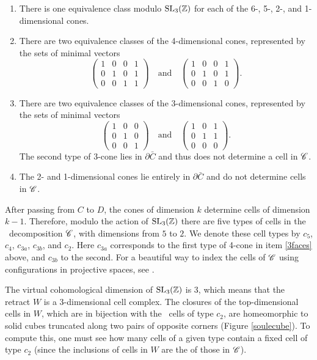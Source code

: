 \begin{enumerate}
\item There is one equivalence class modulo $\operatorname{SL}_{3} (\mathbb{Z})$ for each of the
6-, 5-, 2-, and
1-dimensional cones.
\item There are two equivalence classes of the 4-dimensional cones,
represented by the sets of minimal vectors
\[
\left(\begin{array}{cccc}
1&0&0&1\\
0&1&0&1\\
0&0&1&1
\end{array} \right)\quad\text{and}\quad 
\left(\begin{array}{cccc}
1&0&0&1\\
0&1&0&1\\
0&0&1&0
\end{array} \right).\label{3faces}
\]
\item There are two equivalence classes of the 3-dimensional cones,
represented by the sets of minimal vectors
\[
\left(\begin{array}{cccc}
1&0&0\\
0&1&0\\
0&0&1
\end{array} \right)\quad\text{and}\quad 
\left(\begin{array}{cccc}
1&0&1\\
0&1&1\\
0&0&0
\end{array} \right).
\]
The second type of 3-cone lies in $\partial \bar C$ and thus does 
not determine a cell in $\mathscr C$.

\item The 2- and 1-dimensional cones lie entirely in
$\partial \bar C$ and do not determine cells in $\mathscr C$.
\end{enumerate}

After passing from $C$ to $D$, the cones of dimension $k$ determine
cells of dimension $k-1$.
Therefore, modulo the action of $\operatorname{SL}_{3} (\mathbb{Z})$ there are five types of
cells in the \Vor \ decomposition $\mathscr C$, with dimensions from $5$ to $2$.
We denote these cell types by $c_{5}$, $c_{4}$, $c_{3a}$, $c_{3b}$,
and $c_{2}$.  Here $c_{3a}$ corresponds to the first type of 4-cone in item
\eqref{3faces} above, and $c_{3b}$ to the second.  For a beautiful way
to index the cells of $\mathscr C$ using configurations in projective spaces,
see \cite{M91}.

The virtual cohomological dimension of $\operatorname{SL}_{3} (\mathbb{Z})$ is 3, which
means that the retract $W$ is a 3-dimensional cell complex.  The
closures of the top-dimensional cells in $W$, which are in bijection
with the \Vor \ cells of type $c_{2}$, are homeomorphic to solid cubes
truncated along two pairs of opposite corners (Figure
\ref{soulecube}).  To compute this, one must see how many \Vor cells
of a given type contain a fixed cell of type $c_{2}$ (since the
inclusions of cells in $W$ are the  of those in $\mathscr C$).

